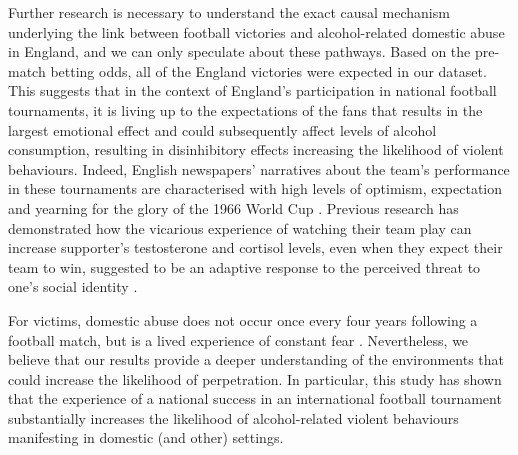\documentclass[12pt, a4paper]{article}
\begin{document}
Further research is necessary to understand the exact causal mechanism underlying the link between football victories and alcohol-related domestic abuse in England, and we can only speculate about these pathways. Based on the pre-match betting odds, all of the England victories were expected in our dataset. This suggests that in the context of England's participation in national football tournaments, it is living up to the expectations of the fans that results in the largest emotional effect and could subsequently affect levels of alcohol consumption, resulting in disinhibitory effects increasing the likelihood of violent behaviours. Indeed, English newspapers' narratives about the team's performance in these tournaments are characterised with high levels of optimism, expectation and yearning for the glory of the 1966 World Cup \cite{Vincent2010}. Previous research has demonstrated how the vicarious experience of watching their team play can increase supporter's testosterone and cortisol levels, even when they expect their team to win, suggested to be an adaptive response to the perceived threat to one's social identity \cite{VanderMeij2012}. 


For victims, domestic abuse does not occur once every four years following a football match, but is a lived experience of constant fear \cite{Brooks-Hay2018}. Nevertheless, we believe that our results provide a deeper understanding of the environments that could increase the likelihood of perpetration. In particular, this study has shown that the experience of a national success in an international football tournament substantially increases the likelihood of alcohol-related violent behaviours manifesting in domestic (and other) settings. 

\newpage




%
%
%
\end{document}
